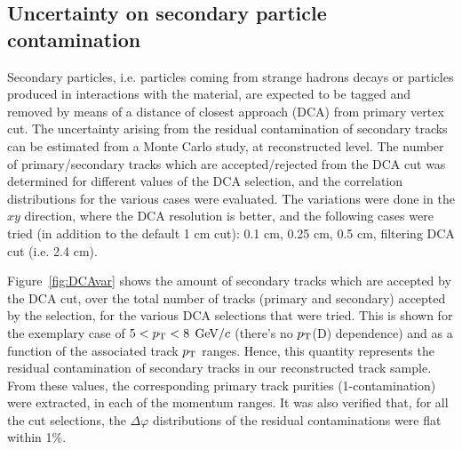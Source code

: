 \subsection{Uncertainty on secondary particle contamination}
Secondary particles, i.e. particles coming from strange hadrons decays or particles produced in interactions with the material, are expected to be tagged and removed by means of a distance of closest approach (DCA) from primary vertex cut. The uncertainty arising from the residual contamination of secondary tracks can be estimated from a Monte Carlo study, at reconstructed level. The number of primary/secondary tracks which are accepted/rejected from the DCA cut was determined for different values of the DCA selection, and the correlation distributions for the various cases were evaluated. The variations were done in the $xy$ direction, where the DCA resolution is better, and the following cases were tried (in addition to the default 1 cm cut): 0.1 cm, 0.25 cm, 0.5 cm, filtering DCA cut (i.e. 2.4 cm).

Figure~\ref{fig:DCAvar} shows the amount of secondary tracks which are accepted by the DCA cut, over the total number of tracks (primary and secondary) accepted by the selection, for the various DCA selections that were tried. This is shown for the exemplary case of $5 < p_{\rm T} < 8$ $\mathrm{GeV}/c$ (there's no $p_{\rm T}$(D) dependence) and as a function of the associated track $p_{\rm T}$ ranges. Hence, this quantity represents the residual contamination of secondary tracks in our reconstructed track sample. From these values, the corresponding primary track purities (1-contamination) were extracted, in each of the momentum ranges.
It was also verified that, for all the cut selections, the $\Delta\varphi$ distributions of the residual contaminations were flat within 1\%.

